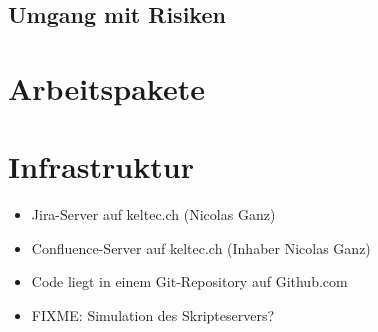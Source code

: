 \documentclass[a4paper]{article}
\begin{document}
\subsection{Umgang mit Risiken}

\section{Arbeitspakete}
\blindtext

%
%
%
%

\section{Infrastruktur}
\begin{itemize}
  \item Jira-Server auf keltec.ch (Nicolas Ganz)
  \item Confluence-Server auf keltec.ch (Inhaber Nicolas Ganz)
  \item Code liegt in einem Git-Repository auf Github.com
  \item FIXME: Simulation des Skripteservers?
\end{itemize}
\end{document}
